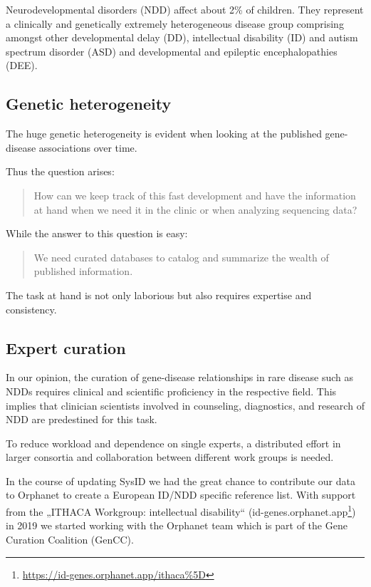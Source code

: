 \documentclass[
]{article}
\renewcommand{\href}[2]{#2\footnote{\url{#1}}}
\begin{document}
Neurodevelopmental disorders (NDD) affect about 2\% of children. They represent a clinically and genetically extremely heterogeneous disease group comprising amongst other developmental delay (DD), intellectual disability (ID) and autism spectrum disorder (ASD) and developmental and epileptic encephalopathies (DEE).

\hypertarget{genetic-heterogeneity}{%
\subsection{Genetic heterogeneity}\label{genetic-heterogeneity}}

The huge genetic heterogeneity is evident when looking at the published gene-disease associations over time.

Thus the question arises:

\begin{quote}
How can we keep track of this fast development and have the information at hand when we need it in the clinic or when analyzing sequencing data?
\end{quote}

While the answer to this question is easy:

\begin{quote}
We need curated databases to catalog and summarize the wealth of published information.
\end{quote}

The task at hand is not only laborious but also requires expertise and consistency.

\hypertarget{expert-curation}{%
\subsection{Expert curation}\label{expert-curation}}

In our opinion, the curation of gene-disease relationships in rare disease such as NDDs requires clinical and scientific proficiency in the respective field. This implies that clinician scientists involved in counseling, diagnostics, and research of NDD are predestined for this task.

To reduce workload and dependence on single experts, a distributed effort in larger consortia and collaboration between different work groups is needed.

In the course of updating SysID we had the great chance to contribute our data to Orphanet to create a European ID/NDD specific reference list. With support from the „ITHACA Workgroup: intellectual disability`` (\href{https://id-genes.orphanet.app/ithaca\%5D}{id-genes.orphanet.app}) in 2019 we started working with the Orphanet team which is part of the Gene Curation Coalition (GenCC).
\end{document}

